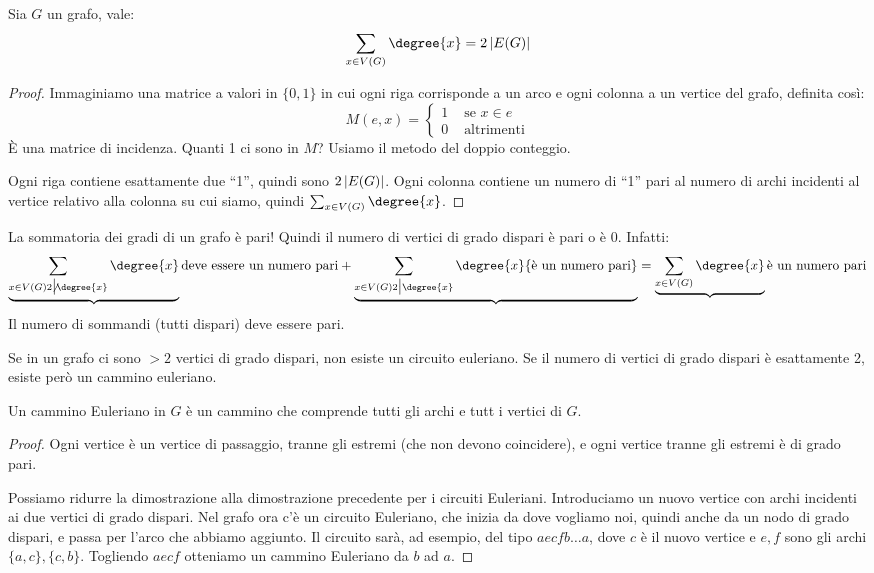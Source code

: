 \begin{prop}
	Sia $G$ un grafo, vale:
	\[
		\sum_{x \in V(G)} \degree{x} = 2 \abs{E(G)}
	\]
\end{prop}

\begin{proof}
	Immaginiamo una matrice a valori in $\{0,1\}$ in cui ogni riga corrisponde a un arco e ogni colonna a un vertice del grafo, definita cos\`i:
	\[
		M(e,x) =
		\begin{cases}
			1 & \text{ se } x \in e \\
			0 & \text{ altrimenti}
		\end{cases}
	\]
	\`E una matrice di incidenza.
	Quanti 1 ci sono in $M$?
	Usiamo il metodo del doppio conteggio.

	Ogni riga contiene esattamente due ``1'', quindi sono $2 \left\lvert{E(G)}\right\rvert$.
	Ogni colonna contiene un numero di ``1'' pari al numero di archi incidenti al vertice relativo alla colonna su cui siamo, quindi $\sum_{x \in V(G)} \degree{x}$.
\end{proof}

La sommatoria dei gradi di un grafo \`e pari!
Quindi il numero di vertici di grado dispari \`e pari o \`e 0.
Infatti:
\[
	\underbrace{\sum_{x \in V(G) \\ 2 \not\divides \degree{x}} \degree{x}}{\text{deve essere un numero pari}} +
	\underbrace{\sum_{x \in V(G) \\ 2 \divides \degree{x}} \degree{x}{\text{\`e un numero pari}}} =
	\underbrace{\sum_{x \in V(G)} \degree{x}}{\text{\`e un numero pari}}
\]
Il numero di sommandi (tutti dispari) deve essere pari.

Se in un grafo ci sono $>2$ vertici di grado dispari, non esiste un circuito euleriano.
Se il numero di vertici di grado dispari \`e esattamente 2, esiste per\`o un cammino euleriano.
\begin{defn}
	Un cammino Euleriano in $G$ \`e un cammino che comprende tutti gli archi e tutt i vertici di $G$.
\end{defn}

\begin{proof}
	Ogni vertice \`e un vertice di passaggio, tranne gli estremi (che non devono coincidere), e ogni vertice tranne gli estremi \`e di grado pari.

	Possiamo ridurre la dimostrazione alla dimostrazione precedente per i circuiti Euleriani.
	Introduciamo un nuovo vertice con archi incidenti ai due vertici di grado dispari.
	Nel grafo ora c'\`e un circuito Euleriano, che inizia da dove vogliamo noi, quindi anche da un nodo di grado dispari, e passa per l'arco che abbiamo aggiunto.
	Il circuito sar\`a, ad esempio, del tipo $aecfb \dots a$, dove $c$ \`e il nuovo vertice e $e,f$ sono gli archi $\{a,c\},\{c,b\}$.
	Togliendo $aecf$ otteniamo un cammino Euleriano da $b$ ad $a$.
\end{proof}

